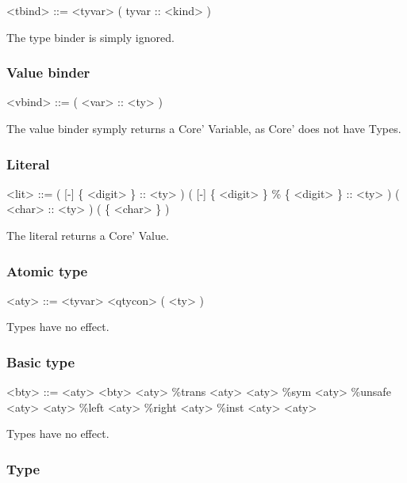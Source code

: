 \begin{grammar}
<tbind> ::= <tyvar>
       \alt ( tyvar :: <kind> )
\end{grammar}

The type binder is simply ignored.

\subsubsection{Value binder}

\begin{grammar}
<vbind> ::= ( <var> :: <ty> )
\end{grammar}

The value binder symply returns a Core' Variable, as Core' does not have Types.

\subsubsection{Literal}

\begin{grammar}
<lit> ::= ( [-] \{ <digit> \} :: <ty> )
     \alt ( [-] \{ <digit> \} \% \{ <digit> \} :: <ty> )
     \alt ( <char> :: <ty> )
     \alt ( \{ <char> \} )
\end{grammar}

The literal returns a Core' Value.

\subsubsection{Atomic type}

\begin{grammar}
<aty> ::= <tyvar>
     \alt <qtycon>
     \alt ( <ty> )
\end{grammar}

Types have no effect.

\subsubsection{Basic type}

\begin{grammar}
<bty> ::= <aty>
     \alt <bty> <aty>
     \alt \%trans <aty> <aty>
     \alt \%sym <aty>
     \alt \%unsafe <aty> <aty>
     \alt \%left <aty>
     \alt \%right <aty>
     \alt \%inst <aty> <aty>
\end{grammar}

Types have no effect.

\subsubsection{Type}


